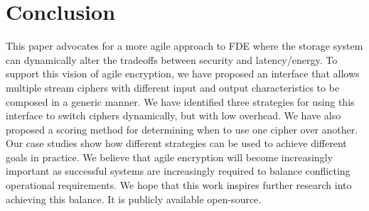 \section{Conclusion}\label{sec:conclusion} This paper advocates for a more agile
approach to FDE where the storage system can dynamically alter the tradeoffs
between security and latency/energy. To support this vision of agile encryption,
we have proposed an interface that allows multiple stream ciphers with different
input and output characteristics to be composed in a generic manner. We have
identified three strategies for using this interface to switch ciphers
dynamically, but with low overhead. We have also proposed a scoring method for
determining when to use one cipher over another. Our case studies show how
different strategies can be used to achieve different goals in practice. We
believe that agile encryption will become increasingly important as successful
systems are increasingly required to balance conflicting operational
requirements. We hope that this work inspires further research into achieving
this balance. It is publicly available open-source.

